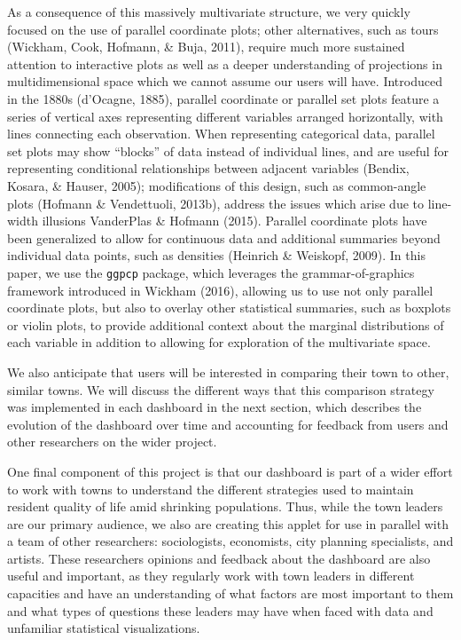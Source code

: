\documentclass[print]{nuthesis}
\begin{document}
As a consequence of this massively multivariate structure, we very quickly focused on the use of parallel coordinate plots; other alternatives, such as tours (Wickham, Cook, Hofmann, \& Buja, 2011), require much more sustained attention to interactive plots as well as a deeper understanding of projections in multidimensional space which we cannot assume our users will have. Introduced in the 1880s (d'Ocagne, 1885), parallel coordinate or parallel set plots feature a series of vertical axes representing different variables arranged horizontally, with lines connecting each observation. When representing categorical data, parallel set plots may show ``blocks'' of data instead of individual lines, and are useful for representing conditional relationships between adjacent variables (Bendix, Kosara, \& Hauser, 2005); modifications of this design, such as common-angle plots (Hofmann \& Vendettuoli, 2013b), address the issues which arise due to line-width illusions VanderPlas \& Hofmann (2015). Parallel coordinate plots have been generalized to allow for continuous data and additional summaries beyond individual data points, such as densities (Heinrich \& Weiskopf, 2009). In this paper, we use the \texttt{ggpcp} package, which leverages the grammar-of-graphics framework introduced in Wickham (2016), allowing us to use not only parallel coordinate plots, but also to overlay other statistical summaries, such as boxplots or violin plots, to provide additional context about the marginal distributions of each variable in addition to allowing for exploration of the multivariate space.

We also anticipate that users will be interested in comparing their town to other, similar towns. We will discuss the different ways that this comparison strategy was implemented in each dashboard in the next section, which describes the evolution of the dashboard over time and accounting for feedback from users and other researchers on the wider project.

One final component of this project is that our dashboard is part of a wider effort to work with towns to understand the different strategies used to maintain resident quality of life amid shrinking populations. Thus, while the town leaders are our primary audience, we also are creating this applet for use in parallel with a team of other researchers: sociologists, economists, city planning specialists, and artists. These researchers opinions and feedback about the dashboard are also useful and important, as they regularly work with town leaders in different capacities and have an understanding of what factors are most important to them and what types of questions these leaders may have when faced with data and unfamiliar statistical visualizations.
\end{document}
